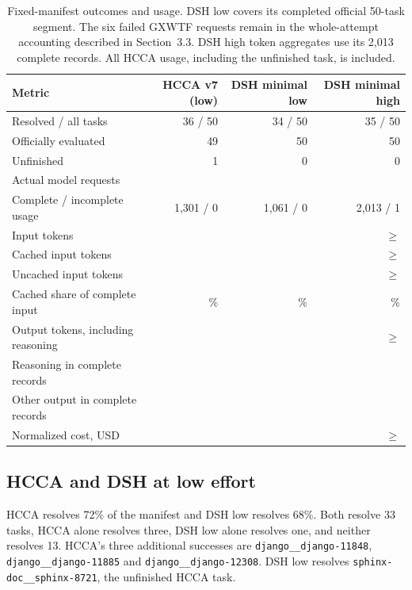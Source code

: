 \documentclass[10pt,a4paper]{article}
\begin{document}
\begin{table}[ht]
\centering
\small
\setlength{\tabcolsep}{4pt}
\begin{tabular}{lrrr}
\toprule
Metric & HCCA v7 (low) & DSH minimal low & DSH minimal high\\
\midrule
Resolved / all tasks & 36 / 50 & 34 / 50 & 35 / 50\\
Officially evaluated & 49 & 50 & 50\\
Unfinished & 1 & 0 & 0\\
Actual model requests & \HRequests{} & \LRequests{} & \BRequests{}\\
Complete / incomplete usage & 1,301 / 0 & 1,061 / 0 & 2,013 / 1\\
Input tokens & \HInput{} & \LInput{} & $\geq$\BInput{}\\
Cached input tokens & \HCached{} & \LCached{} & $\geq$\BCached{}\\
Uncached input tokens & \HMiss{} & \LMiss{} & $\geq$\BMiss{}\\
Cached share of complete input & \HCachePct{}\% & \LCachePct{}\% & \BCachePct{}\%\\
Output tokens, including reasoning & \HOutput{} & \LOutput{} & $\geq$\BOutput{}\\
Reasoning in complete records & \HReasoning{} & \LReasoning{} & \BReasoning{}\\
Other output in complete records & \HOtherOutput{} & \LOtherOutput{} & \BOtherOutput{}\\
Normalized cost, USD & \HCost{} & \LCost{} & $\geq$\BCost{}\\
\bottomrule
\end{tabular}
\caption{Fixed-manifest outcomes and usage. DSH low covers its completed official
50-task segment. The six failed GXWTF requests remain in the whole-attempt
accounting described in Section~3.3. DSH high token aggregates use its 2,013
complete records. All HCCA usage, including the unfinished task, is included.}
\label{tab:results}
\end{table}

\subsection{HCCA and DSH at low effort}

HCCA resolves 72\% of the manifest and DSH low resolves 68\%. Both resolve 33
tasks, HCCA alone resolves three, DSH low alone resolves one, and neither
resolves 13. HCCA's three additional successes are
\texttt{django\_\_django-11848}, \texttt{django\_\_django-11885} and
\texttt{django\_\_django-12308}. DSH low resolves
\texttt{sphinx-doc\_\_sphinx-8721}, the unfinished HCCA task.
\end{document}
